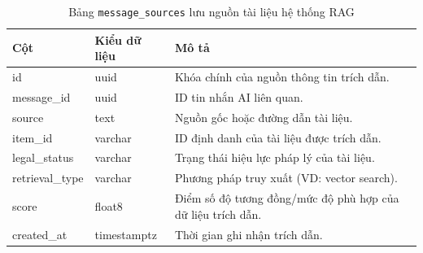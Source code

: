 \begin{table}[H]
\centering
\begin{tabular}{|l|l|p{6cm}|}
\hline
\textbf{Cột} & \textbf{Kiểu dữ liệu} & \textbf{Mô tả} \\ \hline
id & uuid & Khóa chính của nguồn thông tin trích dẫn. \\ \hline
message\_id & uuid & ID tin nhắn AI liên quan. \\ \hline
source & text & Nguồn gốc hoặc đường dẫn tài liệu. \\ \hline
item\_id & varchar & ID định danh của tài liệu được trích dẫn. \\ \hline
legal\_status & varchar & Trạng thái hiệu lực pháp lý của tài liệu. \\ \hline
retrieval\_type & varchar & Phương pháp truy xuất (VD: vector search). \\ \hline
score & float8 & Điểm số độ tương đồng/mức độ phù hợp của dữ liệu trích dẫn. \\ \hline
created\_at & timestamptz & Thời gian ghi nhận trích dẫn. \\ \hline
\end{tabular}
\caption{Bảng \texttt{message\_sources} lưu nguồn tài liệu hệ thống RAG}
\end{table}
